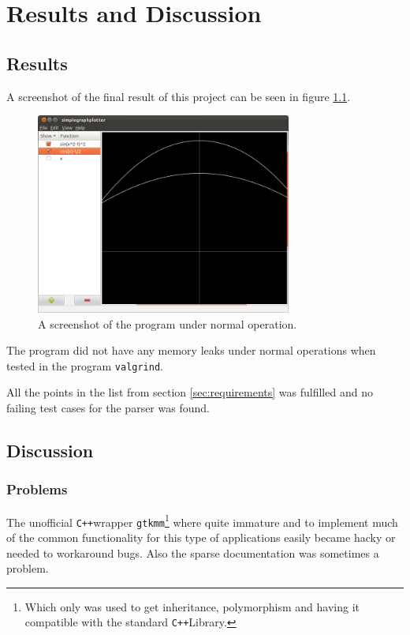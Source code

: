 \documentclass[a4paper,11pt]{kth-mag}
\newcommand{\Cpp}{\texttt{C++}}
\newcommand{\Gtkmm}{\texttt{gtkmm}}
\begin{document}
\chapter{Results and Discussion}

\section{Results}
A screenshot of the final result of this project can be seen in figure
\ref{fig:screenshot}.
\begin{figure}[H]
\begin{center}
    \includegraphics[width=0.75\textwidth]{screenshot00.png}
    \caption{\small{A screenshot of the program under normal operation.}}
   \label{fig:screenshot}
\end{center}
\end{figure}

The program did not have any memory leaks under normal operations when tested in the program
\texttt{valgrind}.

All the points in the list from section \ref{sec:requirements} was fulfilled
and no failing test cases for the parser was found. 

\section{Discussion}
    \subsection{Problems}
        The unofficial \Cpp wrapper 
        \Gtkmm\footnote{Which only was used to get inheritance, polymorphism
        and having it  compatible with the standard \Cpp Library.} where quite 
        immature and to implement much of the common functionality for this 
        type of applications easily became hacky or needed to workaround bugs. 
        Also the sparse documentation was sometimes a problem.
        
\end{document}
